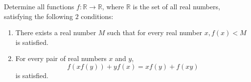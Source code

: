 Determine all functions $f:\mathbb{R}\to\mathbb{R}$, where $\mathbb{R}$ is the set of all real numbers, satisfying the following $2$ conditions:
\begin{enumerate}[label=(\arabic*)]
	\item There exists a real number $M$ such that for every real number $x,f(x)<M$ is satisfied.
	\item For every pair of real numbers $x$ and $y$, \[ f(xf(y))+yf(x)=xf(y)+f(xy)\] is satisfied.
\end{enumerate}